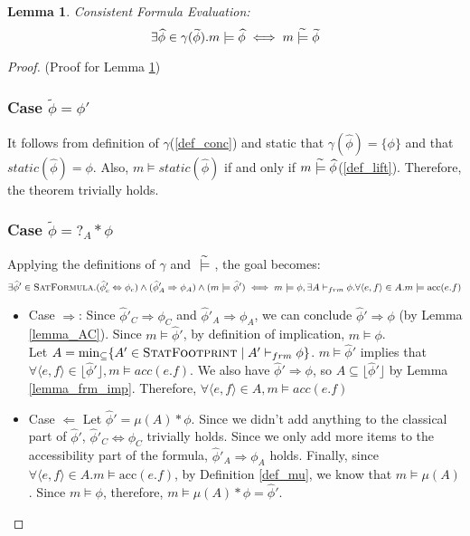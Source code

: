 \documentclass {article}
\newtheorem{lemma}[theorem]{Lemma}
\newcommand{\fphi}{\widehat{\phi}}
\newcommand{\tphi}{\widetilde{\phi}}
\newcommand{\acc}[1]{\text{acc}(#1)}
\newcommand{\consistent}{\models}
\newcommand{\tconsistent}{\hspace{1mm}\widetilde{\models}\hspace{1mm}}
\newcommand{\frm}{\vdash_{frm}}
\newcommand{\satdef}{\textsc{SatFormula}}
\newcommand{\statfprint}{\textsc{StatFootprint}}
\begin{document}
\begin{lemma}
\label{lemma_eval_lift}
Consistent Formula Evaluation: $$\exists \fphi \in \gamma(\tphi).m \consistent  \fphi \iff m \tconsistent \tphi$$

\end{lemma}
\begin{proof} (Proof for Lemma \ref{lemma_eval_lift})
\subsubsection*{Case $\tphi = \phi'$}
 It follows from definition of $\gamma$(\ref{def_conc}) and static that $\gamma(\fphi) = \{\phi\}$ and that $static(\fphi) = \phi$. Also, $m \consistent static(\fphi)$ if and only if $m \tconsistent \fphi$(\ref{def_lift}). Therefore, the theorem trivially holds.
 


 \subsubsection*{Case $\tphi = ?_A \ast \phi$}
 Applying the definitions of $\gamma$ and $\tconsistent$, the goal becomes: $$\exists \fphi' \in 
\satdef. (\fphi'_c \Leftrightarrow \phi_c) \wedge (\fphi'_A \Rightarrow \phi_A) \wedge (m \consistent  \fphi') \iff m \consistent \phi, \exists A \frm \phi.\forall \langle e,f\rangle  \in A. m \consistent \acc{e.f}$$
 \begin{itemize}
 	\item Case $\Rightarrow$: Since $\fphi'_C \Rightarrow \phi_C$ and $\fphi'_A \Rightarrow \phi_A$, we can conclude $\fphi' \Rightarrow \phi$ (by Lemma \ref{lemma_AC}). Since $m \consistent \fphi'$, by definition of implication, $m \consistent \phi$.\\ 
Let $A = \min_{\subseteq}\{A' \in \statfprint \mid A' \frm \phi\}$. $m \consistent \fphi'$ implies that $\forall \langle e,f\rangle  \in \lfloor \fphi' \rfloor, m \consistent acc(e.f)$. We also have $\fphi' \Rightarrow \phi$, so $A \subseteq \lfloor \fphi' \rfloor$ by Lemma \ref{lemma_frm_imp}. Therefore, $\forall \langle e,f\rangle  \in A, m \consistent acc(e.f)$
 	\item Case $\Leftarrow$ Let $\fphi' = \mu(A) \ast \phi$. Since we didn't add anything to the classical part of $\fphi'$, $\fphi'_C \Leftrightarrow \phi_C$ trivially holds. Since we only add more items to the accessibility part of the formula, $\fphi'_A \Rightarrow \phi_A$ holds. Finally, since $\forall \langle e,f\rangle  \in A. m \consistent \acc{e.f}$, by Definition \ref{def_mu}, we know that $m \consistent \mu(A)$. Since $m \consistent \phi$, therefore, $m \consistent \mu(A) * \phi = \fphi'$.\\
 \end{itemize}
 

\end{proof}
\end{document}

